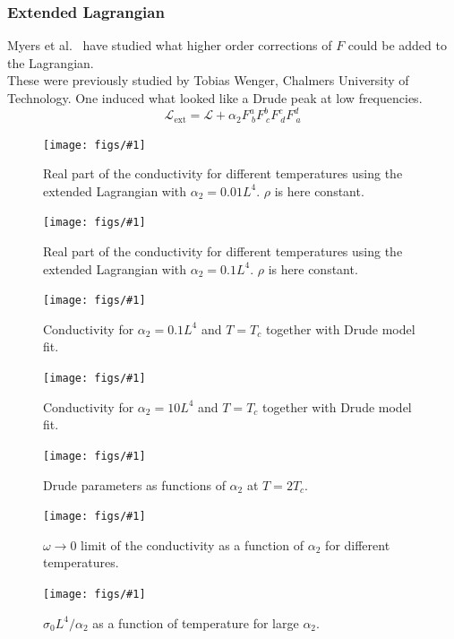 \documentclass{beamer}
\newcommand{\fig}[2]{
\begin{figure}
\centering
\texttt{[image: figs/\#1]}
\caption{#2}
\end{figure}
}
\begin{document}
\begin{frame}
\frametitle{Extended Lagrangian}
Myers et al.~\cite{Myers:2010pk} have studied what higher order corrections of $F$ could be added to the Lagrangian.\\
These were previously studied by Tobias Wenger, Chalmers University of Technology.
One induced what looked like a Drude peak at low frequencies.
\begin{equation}
 \mathcal{L}_\mathrm{ext}=\mathcal{L}+\alpha_2F^a_{\ b}F^b_{\ c}F^c_{\ d}F^d_{\ a}
\end{equation}
\end{frame}

\begin{frame}
\fig{cond_Ts_a2_0.01_v2.pdf}{Real part of the conductivity for different temperatures using the extended Lagrangian with $\alpha_2=0.01L^4$. $\rho$ is here constant.\label{f:cond_a2_1}}
\end{frame}

\begin{frame}
\fig{cond_Ts_a2_0.1_v2.pdf}{Real part of the conductivity for different temperatures using the extended Lagrangian with $\alpha_2=0.1L^4$. $\rho$ is here constant.\label{f:cond_a2_2}}
\end{frame}

\begin{frame}
\fig{drude_T_1Tc_a2_0.1}{Conductivity for $\alpha_2=0.1L^4$ and $T=T_c$ together with Drude model fit.\label{f:drude}}
\end{frame}

\begin{frame}
\fig{drude_T_1Tc_a2_10}{Conductivity for $\alpha_2=10L^4$ and $T=T_c$ together with Drude model fit.\label{f:drude2}}
\end{frame}

\begin{frame}
\fig{drudeVara2_T=2Tc}{Drude parameters as functions of $\alpha_2$ at $T=2T_c$.\label{f:drudeVar}}
\end{frame}

\begin{frame}
\fig{drudeVarMT}{$\omega\rightarrow0$ limit of the conductivity as a function of $\alpha_2$ for different temperatures.\label{f:drudeVarT}}
\end{frame}

\begin{frame}
\fig{drudeTdep_1e4}{$\sigma_0L^4/\alpha_2$ as a function of temperature for large $\alpha_2$.\label{f:Cdep}}
\end{frame}
\end{document}
